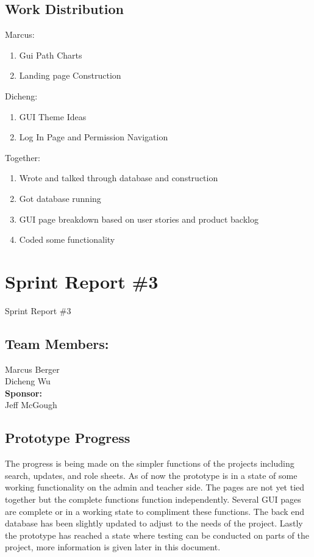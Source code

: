 \subsection{Work Distribution}

Marcus:
\begin{enumerate}
\item Gui Path Charts
\item Landing page Construction\\
\end{enumerate}

Dicheng:
\begin{enumerate}
\item GUI Theme Ideas
\item Log In Page and Permission Navigation\\
\end{enumerate}


Together:
\begin{enumerate}
\item Wrote and talked through database and construction
\item Got database running
\item GUI page breakdown based on user stories and product backlog
\item Coded some functionality
\end{enumerate}


\section{Sprint Report \#3}

Sprint Report \#3


\subsection{Team Members:}
Marcus Berger
\\Dicheng Wu\\
\textbf{Sponsor:}
\\Jeff McGough
\\

\subsection{Prototype Progress}
The progress is being made on the simpler functions of the projects including search, updates, and role sheets. As of now the prototype is in a state of some working functionality on the admin and teacher side. The pages are not yet tied together but the complete functions function independently. Several GUI pages are complete or in a working state to compliment these functions. The back end database has been slightly updated to adjust to the needs of the project. Lastly the prototype has reached a state where testing can be conducted on parts of the project, more information is given later in this document.

